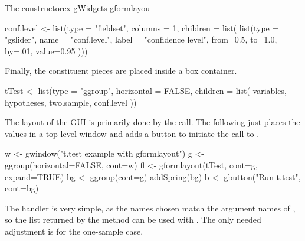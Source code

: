 \begin{example}{The  constructor}{ex-gWidgets-gformlayou}
\begin{Schunk}
\begin{Sinput}
 conf.level <- 
   list(type = "fieldset",
        columns = 1,
        children = list(
          list(type = "gslider",
               name = "conf.level", label = "confidence level",
               from=0.5, to=1.0, by=.01, value=0.95
               )))
\end{Sinput}
\end{Schunk}
Finally, the constituent pieces are placed inside a box container.
\begin{Schunk}
\begin{Sinput}
 tTest <- list(type = "ggroup",
               horizontal = FALSE,
               children = list(
                 variables,
                 hypotheses,
                 two.sample,
                 conf.level
                 ))
\end{Sinput}
\end{Schunk}

The layout of the GUI is primarily done by the 
call. The following just places the values in a top-level window and adds a
button to initiate the call to .

\begin{Schunk}
\begin{Sinput}
 w <- gwindow("t.test example with gformlayout")
 g <- ggroup(horizontal=FALSE, cont=w)
 fl <- gformlayout(tTest, cont=g, expand=TRUE)
 bg <- ggroup(cont=g)
 addSpring(bg)
 b <- gbutton("Run t.test", cont=bg)
\end{Sinput}
\end{Schunk}

The handler is very simple, as the names chosen match the argument
names of , so the list returned by the 
method can be used with . The only needed adjustment is
for the one-sample case.

\begin{Schunk}
\end{Schunk}

\end{example}


